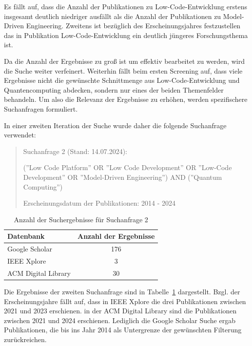 Es fällt auf, dass die Anzahl der Publikationen zu Low-Code-Entwicklung erstens insgesamt deutlich niedriger ausfällt 
als die Anzahl der Publikationen zu Model-Driven Engineering. Zweitens ist bezüglich des Erscheinungsjahres festzustellen 
das in Publikation Low-Code-Entwicklung ein deutlich jüngeres Forschungsthema ist.

Da die Anzahl der Ergebnisse zu groß ist um effektiv bearbeitet zu werden, wird die Suche 
weiter verfeinert. Weiterhin fällt beim ersten Screening auf, dass viele Ergebnisse nicht die 
gewünschte Schnittmenge aus Low-Code-Entwicklung und Quantencomputing abdecken, sondern 
nur eines der beiden Themenfelder behandeln. Um also die Relevanz der Ergebnisse zu erhöhen, 
werden spezifischere Suchanfragen formuliert. 

In einer zweiten Iteration der Suche wurde daher die folgende Suchanfrage verwendet:

\begin{quote}
    Suchanfrage 2 (Stand: 14.07.2024):

    (''Low Code Platform'' OR ''Low Code Development'' OR ''Low-Code Development'' OR ''Model-Driven Engineering'') AND (''Quantum Computing'')

    Erscheinungsdatum der Publikationen: 2014 - 2024
\end{quote}

\begin{table}[h!]
    \centering
    \caption{Anzahl der Suchergebnisse für Suchanfrage 2}
    \label{tab:search_2_results}
    \begin{tabular}{|l|c|}
    \hline
    \textbf{Datenbank} & \textbf{Anzahl der Ergebnisse} \\ \hline
    Google Scholar & 176 \\ \hline
    IEEE Xplore & 3 \\ \hline
    ACM Digital Library & 30 \\ \hline
    \end{tabular}
\end{table}

Die Ergebnisse der zweiten Suchanfrage sind in Tabelle~\ref{tab:search_2_results} dargestellt. Bzgl. der Erscheinungsjahre fällt auf, dass in 
IEEE Xplore die drei Publikationen zwischen 2021 und 2023 erschienen. in der ACM Digital Library sind die Publikationen zwischen 2021 und 2024 erschienen. 
Lediglich die Google Scholar Suche ergab Publikationen, die bis ins Jahr 2014 als Untergrenze der gewünschten Filterung zurückreichen. 

